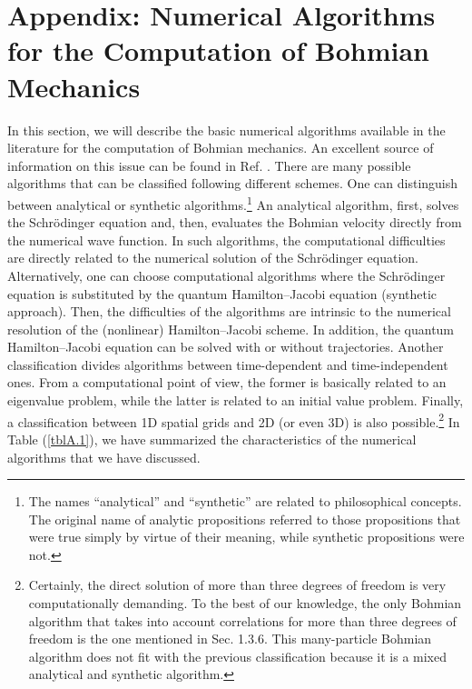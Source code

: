 \documentclass[onecolumn,nofootinbib, secnumarabic, amsmath, nobibnotes,12pt,aps,pra]{revtex4-1}
\newcommand{\tref}[1]{Table (\ref{#1})}
\begin{document}
\section[Appendix]{Appendix: Numerical Algorithms for the Computation of Bohmian Mechanics}\label{om.sec_comput}

In this section, we will describe the basic numerical algorithms
available in the literature for the computation of Bohmian
mechanics. An excellent source of information on this issue can be
found in Ref. \cite{om.wyatt2005}. There are many possible
algorithms that can be classified following different schemes.
One can distinguish between analytical or synthetic algorithms.\footnote{The names ``analytical'' and ``synthetic'' are related to philosophical concepts. The original name of analytic propositions referred to those propositions that were true simply by virtue of their meaning, while synthetic propositions were not.}
An analytical algorithm, first, solves the Schr\"odinger equation and, then, evaluates the Bohmian velocity directly from the numerical wave function. In such algorithms, the computational difficulties are directly related to the numerical solution of the Schr\"odinger equation. Alternatively, one can choose computational algorithms where the Schr\"odinger equation is substituted by the quantum Hamilton--Jacobi equation (synthetic approach). Then, the difficulties of the algorithms are intrinsic to the numerical resolution of the (nonlinear) Hamilton--Jacobi scheme. In addition,
the quantum Hamilton--Jacobi equation can be solved with or without trajectories. Another classification divides
algorithms between time-dependent and time-independent ones. From a computational point of view, the
former is basically related to an eigenvalue problem, while the latter is related to an initial
value problem. Finally, a classification between 1D spatial grids and 2D (or even 3D)
is also possible.\footnote{Certainly, the direct solution of more than three degrees of freedom is very computationally demanding. To the best of our knowledge, the only Bohmian algorithm that takes into account correlations for more than three degrees of freedom is the one mentioned in Sec. 1.3.6.     
This many-particle Bohmian algorithm does not fit with the previous
classification because it is a mixed analytical and synthetic
algorithm.} In \tref{tblA.1}, we have summarized the characteristics
of the numerical algorithms that we have discussed.
\end{document}

